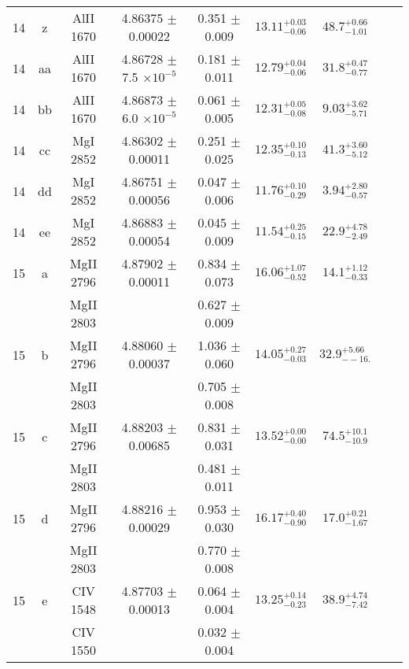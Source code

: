 \documentclass[12pt]{article}
\begin{document}
\begin{footnotesize}
\begin{longtable}{ c c c c c c c c c}
      14  & z  & AlII     1670  &  4.86375 $\pm$ 0.00022  &  0.351 $\pm$ 0.009   & $13.11_{ - 0.06}^{ + 0.03}$  & $48.7_{ - 1.01}^{ + 0.66}$    & 	 & \\ 
      14  & aa  & AlII     1670  &  4.86728 $\pm$ 7.5 $\times 10^{-5}$   &  0.181 $\pm$ 0.011   & $12.79_{ - 0.06}^{ + 0.04}$  & $31.8_{ - 0.77}^{ + 0.47}$    & 	 & \\ 
      14  & bb  & AlII     1670  &  4.86873 $\pm$ 6.0 $\times 10^{-5}$   &  0.061 $\pm$ 0.005   & $12.31_{ - 0.08}^{ + 0.05}$  & $9.03_{ - 5.71}^{ + 3.62}$    & 	 & \\ 
      14  & cc  & MgI     2852  &  4.86302 $\pm$ 0.00011  &  0.251 $\pm$ 0.025   & $12.35_{ - 0.13}^{ + 0.10}$  & $41.3_{ - 5.12}^{ + 3.60}$    & 	 & \\ 
      14  & dd  & MgI     2852  &  4.86751 $\pm$ 0.00056  &  0.047 $\pm$ 0.006   & $11.76_{ - 0.29}^{ + 0.10}$  & $3.94_{ - 0.57}^{ + 2.80}$    & 	 & \\ 
      14  & ee  & MgI     2852  &  4.86883 $\pm$ 0.00054  &  0.045 $\pm$ 0.009   & $11.54_{ - 0.15}^{ + 0.25}$  & $22.9_{ - 2.49}^{ + 4.78}$    & 	 & \\ 
      15  & a  & MgII     2796  &  4.87902 $\pm$ 0.00011  &  0.834 $\pm$ 0.073   & $16.06_{ - 0.52}^{ + 1.07}$  & $14.1_{ - 0.33}^{ + 1.12}$    & 	 & \\ 
  &   & MgII     2803  &  &  0.627 $\pm$ 0.009   &   &     & 	 & \\ 
      15  & b  & MgII     2796  &  4.88060 $\pm$ 0.00037  &  1.036 $\pm$ 0.060   & $14.05_{ - 0.03}^{ + 0.27}$  & $32.9_{ - -16.}^{ + 5.66}$    & 	 & \\ 
  &   & MgII     2803  &  &  0.705 $\pm$ 0.008   &   &     & 	 & \\ 
      15  & c  & MgII     2796  &  4.88203 $\pm$ 0.00685  &  0.831 $\pm$ 0.031   & $13.52_{ - 0.00}^{ + 0.00}$  & $74.5_{ - 10.9}^{ + 10.1}$    & 	 & \\ 
  &   & MgII     2803  &  &  0.481 $\pm$ 0.011   &   &     & 	 & \\ 
      15  & d  & MgII     2796  &  4.88216 $\pm$ 0.00029  &  0.953 $\pm$ 0.030   & $16.17_{ - 0.90}^{ + 0.40}$  & $17.0_{ - 1.67}^{ + 0.21}$    & 	 & \\ 
  &   & MgII     2803  &  &  0.770 $\pm$ 0.008   &   &     & 	 & \\ 
      15  & e  & CIV     1548  &  4.87703 $\pm$ 0.00013  &  0.064 $\pm$ 0.004   & $13.25_{ - 0.23}^{ + 0.14}$  & $38.9_{ - 7.42}^{ + 4.74}$    & 	 & \\ 
  &   & CIV     1550  &  &  0.032 $\pm$ 0.004   &   &     & 	 & \\ 

\end{longtable}
\end{footnotesize}
\end{document}
